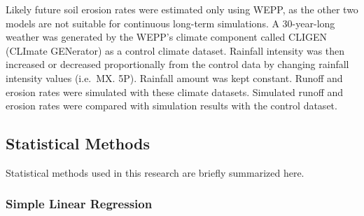 %
Likely future soil erosion rates were estimated only using WEPP, as the other
two models are not suitable for continuous long-term simulations. A 30-year-long
weather was generated by the WEPP's climate component called CLIGEN
(CLImate GENerator) as a control climate dataset. Rainfall intensity was then
increased or decreased proportionally from the control data by changing rainfall
intensity values (i.e.\ {MX. 5P}). Rainfall amount was kept constant. Runoff and
erosion rates were simulated with these climate datasets. Simulated runoff and
erosion rates were compared with simulation results with the control dataset.

\subsection{Statistical Methods}
\label{StatisticalMethodsForTrendInvestigation}

Statistical methods used in this research are briefly summarized here.

\subsubsection{Simple Linear Regression}
\label{sec:SimpleLinearRegression}

